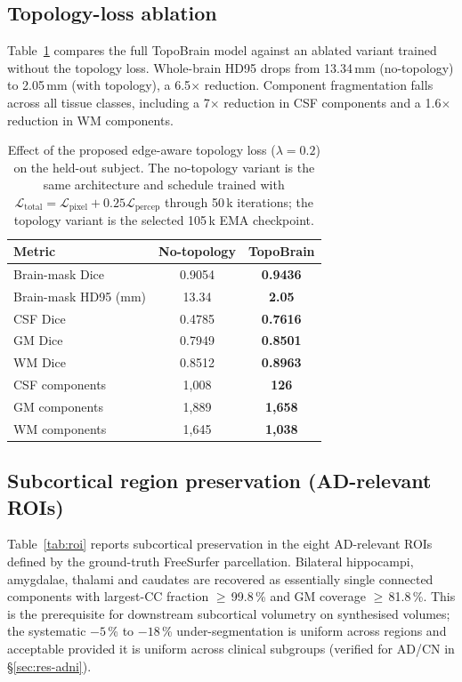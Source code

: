 \documentclass[10pt,twocolumn,a4paper]{article}
\begin{document}
\subsection{Topology-loss ablation}
\label{sec:res-ablation}

Table~\ref{tab:ablation} compares the full TopoBrain model against an
ablated variant trained without the topology loss. Whole-brain HD95
drops from 13.34\,mm (no-topology) to 2.05\,mm (with topology), a
6.5$\times$ reduction. Component fragmentation falls across all
tissue classes, including a 7$\times$ reduction in CSF components and
a 1.6$\times$ reduction in WM components.

\begin{table}[!t]
\caption{Effect of the proposed edge-aware topology loss
($\lambda=0.2$) on the held-out subject. The no-topology variant is
the same architecture and schedule trained with
$\mathcal{L}_\text{total}=\mathcal{L}_\text{pixel}+0.25\mathcal{L}_\text{percep}$
through 50\,k iterations; the topology variant is the selected 105\,k
EMA checkpoint.}
\label{tab:ablation}
\centering
\small
\begin{tabular}{lcc}
\toprule
Metric & No-topology & TopoBrain \\
\midrule
Brain-mask Dice            & 0.9054 & \textbf{0.9436} \\
Brain-mask HD95 (mm)       & 13.34  & \textbf{2.05}   \\
CSF Dice                   & 0.4785 & \textbf{0.7616} \\
GM Dice                    & 0.7949 & \textbf{0.8501} \\
WM Dice                    & 0.8512 & \textbf{0.8963} \\
CSF components             & 1{,}008 & \textbf{126}   \\
GM components              & 1{,}889 & \textbf{1{,}658}\\
WM components              & 1{,}645 & \textbf{1{,}038}\\
\bottomrule
\end{tabular}
\end{table}

\subsection{Subcortical region preservation (AD-relevant ROIs)}
\label{sec:res-roi}

Table~\ref{tab:roi} reports subcortical preservation in the eight
AD-relevant ROIs defined by the ground-truth FreeSurfer parcellation.
Bilateral hippocampi, amygdalae, thalami and caudates are recovered as
essentially single connected components with largest-CC fraction
$\geq$\,99.8\,\% and GM coverage $\geq$\,81.8\,\%. This is the
prerequisite for downstream subcortical volumetry on synthesised
volumes; the systematic $-5$\,\% to $-18$\,\% under-segmentation is
uniform across regions and acceptable provided it is uniform across
clinical subgroups (verified for AD/CN in \S\ref{sec:res-adni}).
\end{document}
